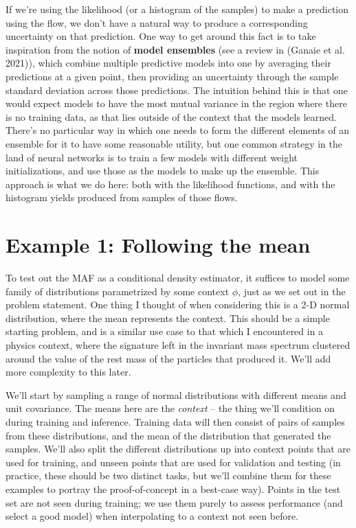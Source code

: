 \documentclass[
  11pt,
  numbers=noendperiod]{book}
\begin{document}
If we're using the likelihood (or a histogram of the samples) to make a
prediction using the flow, we don't have a natural way to produce a
corresponding uncertainty on that prediction. One way to get around this
fact is to take inspiration from the notion of \textbf{model ensembles}
(see a review in (Ganaie et al. 2021)), which combine multiple
predictive models into one by averaging their predictions at a given
point, then providing an uncertainty through the sample standard
deviation across those predictions. The intuition behind this is that
one would expect models to have the most mutual variance in the region
where there is no training data, as that lies outside of the context
that the models learned. There's no particular way in which one needs to
form the different elements of an ensemble for it to have some
reasonable utility, but one common strategy in the land of neural
networks is to train a few models with different weight initializations,
and use those as the models to make up the ensemble. This approach is
what we do here: both with the likelihood functions, and with the
histogram yields produced from samples of those flows.

\hypertarget{example-1-following-the-mean}{%
\section{Example 1: Following the
mean}\label{example-1-following-the-mean}}

To test out the MAF as a conditional density estimator, it suffices to
model some family of distributions parametrized by some context
\(\phi\), just as we set out in the problem statement. One thing I
thought of when considering this is a 2-D normal distribution, where the
mean represents the context. This should be a simple starting problem,
and is a similar use case to that which I encountered in a physics
context, where the signature left in the invariant mass spectrum
clustered around the value of the rest mass of the particles that
produced it. We'll add more complexity to this later.

We'll start by sampling a range of normal distributions with different
means and unit covariance. The means here are the \emph{context} -- the
thing we'll condition on during training and inference. Training data
will then consist of pairs of samples from these distributions, and the
mean of the distribution that generated the samples. We'll also split
the different distributions up into context points that are used for
training, and unseen points that are used for validation and testing (in
practice, these should be two distinct tasks, but we'll combine them for
these examples to portray the proof-of-concept in a best-case way).
Points in the test set are not seen during training; we use them purely
to assess performance (and select a good model) when interpolating to a
context not seen before.
\end{document}
